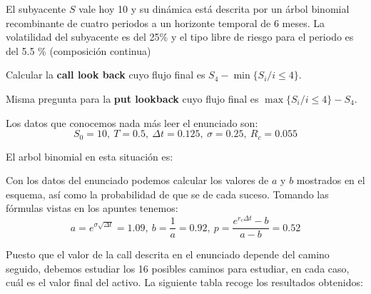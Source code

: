 \begin{problem}[1]
El subyacente $S$ vale hoy 10 y su dinámica está descrita por un árbol binomial recombinante de cuatro periodos a un horizonte temporal de 6 meses. La volatilidad del subyacente es del 25\% y el tipo libre de riesgo para el periodo es del 5.5 \% (composición continua)

\ppart Calcular la \textbf{call look back} cuyo flujo final es $S_4-\min\{S_i/ i\leq 4\}$.

\ppart Misma pregunta para la \textbf{put lookback} cuyo flujo final es $\max\{S_i / i \leq 4\}-S_4$.
\solution


Los datos que conocemos nada más leer el enunciado son:
\[S_0=10, \ T=0.5, \ Δt = 0.125, \ σ=0.25, \ R_c=0.055\]

El arbol binomial en esta situación es:
\begin{center}
\end{center}

Con los datos del enunciado podemos calcular los valores de $a$ y $b$ mostrados en el esquema, así como la probabilidad de que se de cada suceso. Tomando las fórmulas vistas en los apuntes tenemos:
\[a=e^{σ\sqrt{Δt}} = 1.09, \ b = \frac{1}{a} = 0.92, \ p = \frac{e^{r_cΔt}-b}{a-b}=0.52\]

\spart
Puesto que el valor de la call descrita en el enunciado depende del camino seguido, debemos estudiar los 16 posibles caminos para estudiar, en cada caso, cuál es el valor final del activo. La siguiente tabla recoge los resultados obtenidos:


\end{problem}

